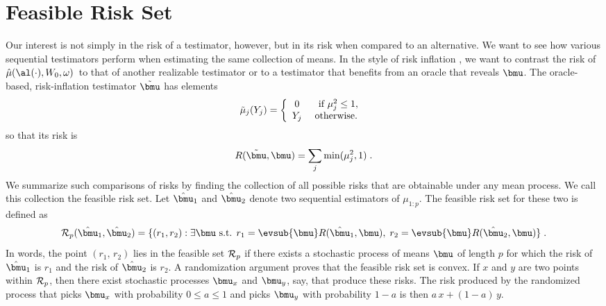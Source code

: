 \documentclass[12pt]{article}
\newcommand{\test}{\mbox{$\hat\mu(\al(\cdot),W_0,\omega)$}}
\begin{document}
\section{ Feasible Risk Set }


 Our interest is not simply in the risk of a testimator, however, but in its
 risk when compared to an alternative.  We want to see how various sequential
 testimators perform when estimating the same collection of means.  In the style
 of risk inflation , we want to contrast the risk of \test\ to that
 of another realizable testimator or to a testimator that benefits from an
 oracle that reveals $\bmu$.  The oracle-based, risk-inflation testimator
 $\tilde{\bmu}$ has elements
 \begin{equation}
   \tilde\mu_j(Y_j) = \left\{ \begin{array}{cc} 
                       0    & \mbox{ if } \mu_j^2 \le 1,        \cr
                       Y_j  & \mbox{ otherwise. }
                \end{array} \right.
 \label{eq:muTilde}
 \end{equation}
 so that its risk is 
 \begin{equation}
    R(\tilde{\bmu},\bmu) = \sum_j \min(\mu_j^2,1) \;.   
 \label{eq:riskMuTilde}
 \end{equation}
 We summarize such comparisons of risks by finding the collection of all
 possible risks that are obtainable under any mean process.  We call this
 collection the feasible risk set.  Let $\hat{\bmu}_1$ and $\hat{\bmu}_2$ denote
 two sequential estimators of $\mu_{1:p}$.  The feasible risk set for these two
 is defined as
 \begin{equation}
     {\cal R}_p(\hat{\bmu}_1,\hat{\bmu}_2) = 
      \{(r_1,r_2):  \exists \bmu \mbox{  s.t.  }
          r_1 = \evsub{\bmu} R(\hat{\bmu}_1,\bmu),\;
          r_2 = \evsub{\bmu} R(\hat{\bmu}_2,\bmu)  \} \;.           
 \label{eq:feasibleSet}
 \end{equation}
 In words, the point $(r_1,\,r_2)$ lies in the feasible set ${\cal R}_p$ if
 there exists a stochastic process of means $\bmu$ of length $p$ for which the
 risk of $\hat{\bmu}_1$ is $r_1$ and the risk of $\hat{\bmu}_2$ is $r_2$.  A
 randomization argument proves that the feasible risk set is convex.  If $x$ and
 $y$ are two points within ${\cal R}_p$, then there exist stochastic processes
 $\bmu_x$ and $\bmu_y$, say, that produce these risks.  The risk produced by the
 randomized process that picks $\bmu_x$ with probability $0 \le a \le 1$ and
 picks $\bmu_y$ with probability $1-a$ is then $a\,x+(1-a)\,y$.
\end{document}
